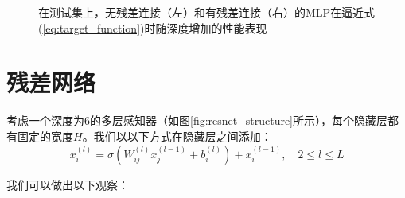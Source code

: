\begin{figure}[H]
\centering
{}
\caption{在测试集上，无残差连接（左）和有残差连接（右）的MLP在逼近式(\ref{eq:target_function})时随深度增加的性能表现}
\label{fig:mlp_performance_test}
\end{figure}

\section{残差网络}
\label{sec:resnets}

考虑一个深度为6的多层感知器（如图\ref{fig:resnet_structure}所示），每个隐藏层都有固定的宽度$H$。我们以以下方式在隐藏层之间添加：
\begin{equation}
x_i^{(l)} = \sigma(W_{ij}^{(l)} x_j^{(l-1)} + b_i^{(l)}) + x_i^{(l-1)}, \quad 2 \leq l \leq L
\label{eq:resnet_equation}
\end{equation}

我们可以做出以下观察：

